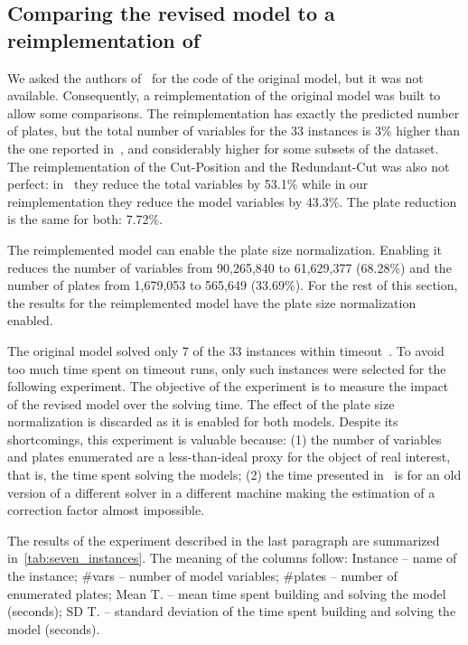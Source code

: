 \subsection{Comparing the revised model to a reimplementation of~\cite{furini:2016}}

We asked the authors of~\cite{furini:2016} for the code of the original model, but it was not available.
Consequently, a reimplementation of the original model was built to allow some comparisons.
The reimplementation has exactly the predicted number of plates, but the total number of variables for the 33 instances is 3\% higher than the one reported in~\cite{furini:2016}, and considerably higher for some subsets of the dataset.
The reimplementation of the Cut-Position and the Redundant-Cut was also not perfect: in~\cite{dimitri_thesis} they reduce the total variables by 53.1\% while in our reimplementation they reduce the model variables by 43.3\%.
The plate reduction is the same for both: 7.72\%.

The reimplemented model can enable the plate size normalization.
Enabling it reduces the number of variables from 90,265,840 to 61,629,377 (68.28\%) and the number of plates from 1,679,053 to 565,649 (33.69\%).
For the rest of this section, the results for the reimplemented model have the plate size normalization enabled.

The original model solved only 7 of the 33 instances within timeout~\cite{furini:2,016}.
To avoid too much time spent on timeout runs, only such instances were selected for the following experiment.
The objective of the experiment is to measure the impact of the revised model over the solving time. 
The effect of the plate size normalization is discarded as it is enabled for both models.
Despite its shortcomings, this experiment is valuable because: (1) the number of variables and plates enumerated are a less-than-ideal proxy for the object of real interest, that is, the time spent solving the models; (2) the time presented in~\cite{furini:2,016} is for an old version of a different solver in a different machine making the estimation of a correction factor almost impossible.

The results of the experiment described in the last paragraph are summarized in~\autoref{tab:seven_instances}.
The meaning of the columns follow: 
Instance -- name of the instance; \#vars -- number of model variables; \#plates -- number of enumerated plates; Mean T. -- mean time spent building and solving the model (seconds); SD T. -- standard deviation of the time spent building and solving the model (seconds).


